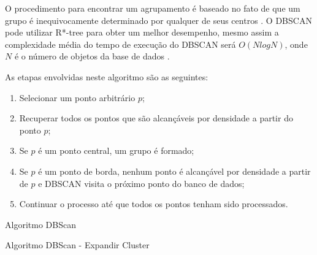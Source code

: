 O procedimento para encontrar um agrupamento é baseado no fato de que um grupo é
inequivocamente determinado por qualquer de seus centros \cite{ESTER1998}. 
O DBSCAN pode utilizar R*-tree para obter um melhor desempenho, mesmo assim  a complexidade média do tempo de execução do DBSCAN será ${O (N logN)}$, onde ${N}$ é o número de objetos da base de dados \cite{Sheikholeslami1998}.


As etapas envolvidas neste algoritmo são as seguintes:

\begin{enumerate}
	\item Selecionar um ponto arbitrário ${p}$;
	\item Recuperar todos os pontos que são alcançáveis por densidade a partir do ponto ${p}$;
	\item Se ${p}$ é um ponto central, um grupo é formado;
	\item Se ${p}$ é um ponto de borda, nenhum ponto é alcançável por densidade a partir de ${p}$ e DBSCAN visita o próximo ponto do banco de dados;
	\item Continuar o processo até que todos os pontos tenham sido processados.
\end{enumerate}


\begin{algorithm}[!ht]
	\SetSpacedAlgorithm
	\caption{\label{alg:algoritmo_dbscan}Algoritmo DBScan}
\end{algorithm}

\begin{algorithm}[!ht]
	\SetSpacedAlgorithm
	\caption{\label{alg:algoritmo_dbscan_exp}Algoritmo DBScan - Expandir Cluster}
\end{algorithm}


